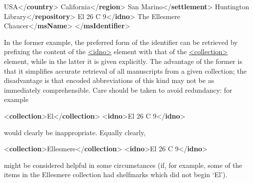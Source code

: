 \begin{shaded}
USA{</\textbf{country}>}\mbox{}\newline 
{}California{</\textbf{region}>}\mbox{}\newline 
{}San Marino{</\textbf{settlement}>}\mbox{}\newline 
{}Huntington Library{</\textbf{repository}>}\mbox{}\newline 
{}El 26 C 9{</\textbf{idno}>}\mbox{}\newline 
{}The Ellesmere Chaucer{</\textbf{msName}>}\mbox{}\newline 
{</\textbf{msIdentifier}>}\end{shaded}\egroup\par \par
In the former example, the preferred form of the identifier can be retrieved by prefixing the content of the \hyperref[TEI.idno]{<idno>} element with that of the \hyperref[TEI.collection]{<collection>} element, while in the latter it is given explicitly. The advantage of the former is that it simplifies accurate retrieval of all manuscripts from a given collection; the disadvantage is that encoded abbreviations of this kind may not be as immediately comprehensible. Care should be taken to avoid redundancy: for example \par\bgroup{}\exampleFont \begin{shaded}\noindent\mbox{}{<\textbf{collection}>}El{</\textbf{collection}>}\mbox{}\newline 
{<\textbf{idno}>}El 26 C 9{</\textbf{idno}>}\end{shaded}\egroup\par \noindent  would clearly be inappropriate. Equally clearly, \par\bgroup{}\exampleFont \begin{shaded}\noindent\mbox{}{<\textbf{collection}>}Ellesmere{</\textbf{collection}>}\mbox{}\newline 
{<\textbf{idno}>}El 26 C 9{</\textbf{idno}>}\end{shaded}\egroup\par \noindent  might be considered helpful in some circumstances (if, for example, some of the items in the Ellesmere collection had shelfmarks which did not begin ‘El’).\par
